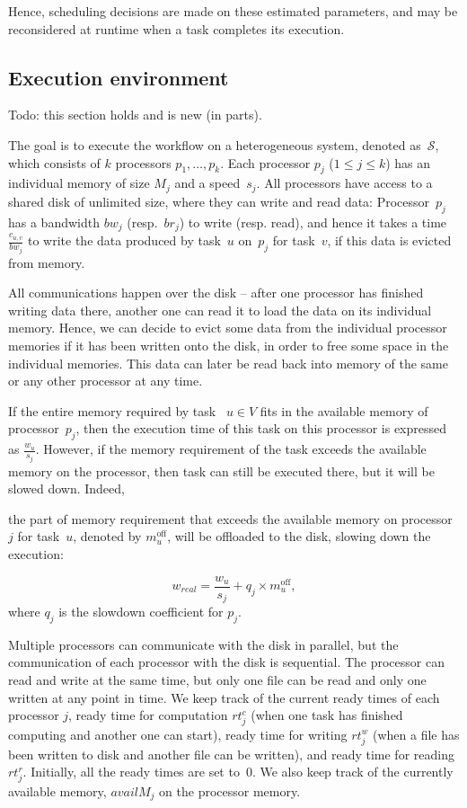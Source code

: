 \documentclass[conference]{IEEEtran}
\newcommand{\cluster}{\,\mathcal{S}}
\newcommand{\rt}{rt}
\newcommand{\bw}{bw}
\newcommand{\br}{br}
\newcommand{\Moff}[1]{m^{\text{off}}_{#1}}
\begin{document}
Hence, scheduling decisions are made on these estimated parameters, and
may be reconsidered at runtime when a task completes its execution. 


    \subsection{Execution environment}
    \label{sec.mod.plat}

    Todo: this section holds and is new (in parts).

The goal is to execute the workflow on a heterogeneous system, denoted as $\cluster$, which
consists of $k$ processors $p_1, \dots, p_k$.
Each processor $p_j$ ($1 \leq j \leq k$) has an individual memory of size $M_j$ and a speed~$s_j$.
All processors have access to a shared disk of unlimited size, where they can write
and read data: Processor~$p_j$ has a bandwidth $\bw_j$ (resp.~$\br_j$) to write  (resp. read),
and hence it takes a time $\frac{c_{u,v}}{bw_j}$ to write the data produced by task~$u$
on~$p_j$ for task~$v$, 
if this data is evicted from memory. 


All communications happen over the disk -- after one processor has finished writing data there, another one can read
it to load the data on its individual memory. 
Hence, we can decide to evict some data from the individual processor memories if it has been 
written onto the disk, 
in order to free some space in the individual memories.
This data can later be read back into memory of the same or any other processor at any time.

If the entire memory required by  task ~$u\in V$ fits in the available memory of processor~$p_j$,
    then the execution time of this task on this processor is expressed as $\frac{w_u}{s_j}$.
However, if the memory requirement of the task exceeds the available memory on the processor, 
then task can still be executed there, but it will be slowed down. Indeed, 

the part of memory requirement that exceeds the available memory on processor~$j$ for task~$u$, 
denoted by $\Moff{u}$,
will be offloaded to the disk, slowing down the execution:

    \[
        w_{real} = \frac{w_u}{s_j} +  q_j \times  \Moff{u},
    \]
where $q_j$ is the slowdown coefficient for $p_j$.

Multiple processors can communicate with the disk in parallel, but the communication of each processor  with the disk is sequential.
The processor can read and write at the same time, but only one file can be read and only one written at any point in time.
We keep track of the current ready times of each processor $j$, ready time for computation $\rt_j^c$ (when one task has finished
computing and another one can start),
ready time for writing $\rt_j^w$ (when a file has been written to disk and another file can be written), and ready time for
 reading~$\rt_j^r$.
Initially, all the ready times are set to~$0$.
We also keep track of the currently available memory, $availM_j$ on the processor memory. 
\end{document}
